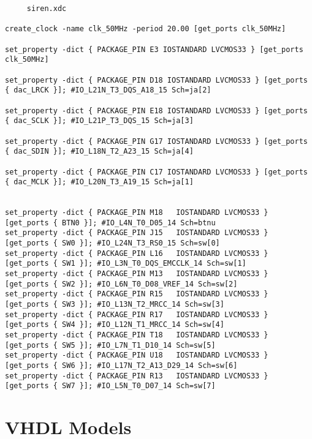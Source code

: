  \begin{verbatim}
     siren.xdc

create_clock -name clk_50MHz -period 20.00 [get_ports clk_50MHz] 

set_property -dict { PACKAGE_PIN E3 IOSTANDARD LVCMOS33 } [get_ports clk_50MHz]

set_property -dict { PACKAGE_PIN D18 IOSTANDARD LVCMOS33 } [get_ports { dac_LRCK }]; #IO_L21N_T3_DQS_A18_15 Sch=ja[2]

set_property -dict { PACKAGE_PIN E18 IOSTANDARD LVCMOS33 } [get_ports { dac_SCLK }]; #IO_L21P_T3_DQS_15 Sch=ja[3]

set_property -dict { PACKAGE_PIN G17 IOSTANDARD LVCMOS33 } [get_ports { dac_SDIN }]; #IO_L18N_T2_A23_15 Sch=ja[4]

set_property -dict { PACKAGE_PIN C17 IOSTANDARD LVCMOS33 } [get_ports { dac_MCLK }]; #IO_L20N_T3_A19_15 Sch=ja[1]


set_property -dict { PACKAGE_PIN M18   IOSTANDARD LVCMOS33 } [get_ports { BTN0 }]; #IO_L4N_T0_D05_14 Sch=btnu
set_property -dict { PACKAGE_PIN J15   IOSTANDARD LVCMOS33 } [get_ports { SW0 }]; #IO_L24N_T3_RS0_15 Sch=sw[0]
set_property -dict { PACKAGE_PIN L16   IOSTANDARD LVCMOS33 } [get_ports { SW1 }]; #IO_L3N_T0_DQS_EMCCLK_14 Sch=sw[1]
set_property -dict { PACKAGE_PIN M13   IOSTANDARD LVCMOS33 } [get_ports { SW2 }]; #IO_L6N_T0_D08_VREF_14 Sch=sw[2]
set_property -dict { PACKAGE_PIN R15   IOSTANDARD LVCMOS33 } [get_ports { SW3 }]; #IO_L13N_T2_MRCC_14 Sch=sw[3]
set_property -dict { PACKAGE_PIN R17   IOSTANDARD LVCMOS33 } [get_ports { SW4 }]; #IO_L12N_T1_MRCC_14 Sch=sw[4]
set_property -dict { PACKAGE_PIN T18   IOSTANDARD LVCMOS33 } [get_ports { SW5 }]; #IO_L7N_T1_D10_14 Sch=sw[5]
set_property -dict { PACKAGE_PIN U18   IOSTANDARD LVCMOS33 } [get_ports { SW6 }]; #IO_L17N_T2_A13_D29_14 Sch=sw[6]
set_property -dict { PACKAGE_PIN R13   IOSTANDARD LVCMOS33 } [get_ports { SW7 }]; #IO_L5N_T0_D07_14 Sch=sw[7]

 \end{verbatim}
 
 \section{VHDL Models}
 
